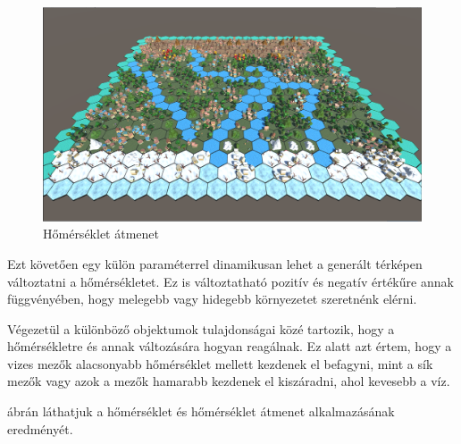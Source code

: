 \begin{figure}[h!]
\centering
\includegraphics[scale=0.5]{kepek/transition.png}
\caption{Hőmérséklet átmenet}
\label{fig:transition}
\end{figure}

Ezt követően egy külön paraméterrel dinamikusan lehet a generált térképen változtatni a hőmérsékletet. Ez is változtatható pozitív és negatív értékűre annak függvényében, hogy melegebb vagy hidegebb környezetet szeretnénk elérni.

Végezetül a különböző objektumok tulajdonságai közé tartozik, hogy a hőmérsékletre és annak változására hogyan reagálnak. Ez alatt azt értem, hogy a vizes mezők alacsonyabb hőmérséklet mellett kezdenek el befagyni, mint a sík mezők vagy azok a mezők hamarabb kezdenek el kiszáradni, ahol kevesebb a víz.

 ábrán láthatjuk a hőmérséklet és hőmérséklet átmenet alkalmazásának eredményét.
